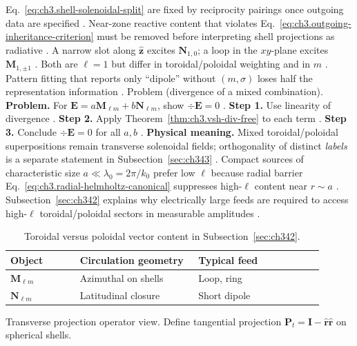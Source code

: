 Eq.~\eqref{eq:ch3.shell-solenoidal-split} are fixed by reciprocity pairings once outgoing data are specified
\cite{stratton1941}. Near-zone reactive content that violates
Eq.~\eqref{eq:ch3.outgoing-inheritance-criterion} must be removed before interpreting shell projections as radiative
\cite{harrington2001}.
A narrow slot along \(\hat{\mathbf{z}}\) excites \(\mathbf{N}_{1,0}\); a loop in the \(xy\)-plane excites
\(\mathbf{M}_{1,\pm1}\) \cite{harrington2001}. Both are \(\ell=1\) but differ in toroidal/poloidal weighting
and in \(m\) \cite{stratton1941}. Pattern fitting that reports only ``dipole'' without \((m,\sigma)\) loses half the
representation information \cite{hansen1988}.
Problem (divergence of a mixed combination). \textbf{Problem.} For \(\mathbf{E}=a\mathbf{M}_{\ell m}+b\mathbf{N}_{\ell m}\), show \(\div\mathbf{E}=0\)
\cite{tai1994}.
\textbf{Step 1.} Use linearity of divergence \cite{jackson1999}.
\textbf{Step 2.} Apply Theorem~\ref{thm:ch3.vsh-div-free} to each term \cite{hansen1988}.
\textbf{Step 3.} Conclude \(\div\mathbf{E}=0\) for all \(a,b\) \cite{stratton1941}.
\textbf{Physical meaning.} Mixed toroidal/poloidal superpositions remain transverse solenoidal fields; orthogonality of
distinct \emph{labels} is a separate statement in Subsection~\ref{sec:ch343} \cite{harrington2001}.
Compact sources of characteristic size \(a\ll\lambda_0=2\pi/k_0\) prefer low \(\ell\) because radial barrier
Eq.~\eqref{eq:ch3.radial-helmholtz-canonical} suppresses high-\(\ell\) content near \(r\sim a\) \cite{jackson1999}.
Subsection~\ref{sec:ch342} explains why electrically large feeds are required to access high-\(\ell\) toroidal/poloidal
sectors in measurable amplitudes \cite{harrington2001}.
\begin{table}[t]
\centering
\caption{Toroidal versus poloidal vector content in Subsection~\ref{sec:ch342}.}
\label{tab:ch3.342-toroidal-poloidal}
\small
\begin{tabular}{@{}p{0.20\linewidth}p{0.34\linewidth}p{0.36\linewidth}@{}}
\toprule
Object & Circulation geometry & Typical feed \\
\midrule
\(\mathbf{M}_{\ell m}\) & Azimuthal on shells & Loop, ring \\
\(\mathbf{N}_{\ell m}\) & Latitudinal closure & Short dipole \\
\bottomrule
\end{tabular}
\end{table}
Transverse projection operator view. Define tangential projection \(\mathbf{P}_{t}=\mathbf{I}-\hat{\mathbf{r}}\hat{\mathbf{r}}\) on spherical shells.
